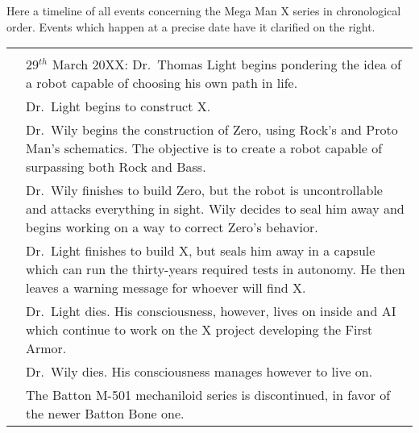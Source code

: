 Here a timeline of all events concerning the Mega Man X series in chronological order. Events which happen at a precise date have it clarified on the right.

\begin{tabularx}{\linewidth}{l X}
	
	\toprule
	\rowcolor{Aquamarine}
	\multicolumn{2}{c}{\textbf{20XX}}\\
	\addlinespace[1.5ex]
	\tabdot&29$^{th}$ March 20XX: Dr.~Thomas Light begins pondering the idea of a robot capable of choosing his own path in life. \\
	\tabdot& Dr.~Light begins to construct X.\\
	\tabdot& Dr.~Wily begins the construction of Zero, using Rock's and Proto Man's schematics. The objective is to create a robot capable of surpassing both Rock and Bass.\\
	\tabdot& Dr.~Wily finishes to build Zero, but the robot is uncontrollable and attacks everything in sight. Wily decides to seal him away and begins working on a way to correct Zero's behavior.\\
	\tabdot& Dr.~Light finishes to build X, but seals him away in a capsule which can run the thirty-years required tests in autonomy. He then leaves a warning message for whoever will find X.\\
	\tabdot& Dr.~Light dies. His consciousness, however, lives on inside and AI which continue to work on the X project developing the First Armor.\\
	\tabdot& Dr.~Wily dies. His consciousness manages however to live on.\\
	\tabdot& The Batton M-501 mechaniloid series is discontinued, in favor of the newer Batton Bone one.\\
	

\end{tabularx}
